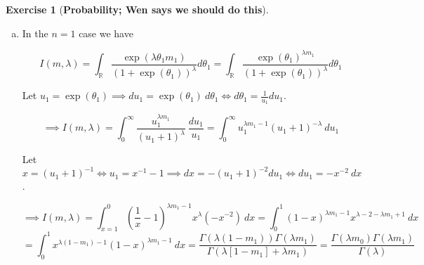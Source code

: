 \documentclass{article}
\theoremstyle{definition}
\newtheorem{exercise}{Exercise}
\theoremstyle{definition}
\theoremstyle{definition}
\theoremstyle{definition}
\begin{document}
\begin{exercise}[\textbf{Probability; Wen says we should do this}]

\begin{enumerate}[(a)]

\item In the \(n=1\) case we have

\[
I(m, \lambda) = \int_{\mathbb{R}} \frac{ \exp(\lambda \theta_1m_1) }{(1 + \exp(\theta_1) ) ^{\lambda}} d \theta_1 = \int_{\mathbb{R}} \frac{ \exp( \theta_1)^{\lambda m_1} }{(1 + \exp(\theta_1) ) ^{\lambda}} d \theta_1
\]

Let \(u_1=  \exp(\theta_1) \implies du_1 =\exp(\theta_1) \ d\theta_1 \iff d\theta_1 = \frac{1}{u_1} du_1\). 

%


\[
\implies I(m, \lambda) =\int_{0}^\infty \frac{ u_1^{\lambda m_1} }{ (u_1 + 1)  ^{\lambda}} \ \frac{ d u_1}{u_1} =\int_{0}^\infty  u_1 ^{\lambda m_1 - 1} (u_1 + 1)  ^{-\lambda} \ d u_1
\]
%
%
%
%

%
%

Let \(x = (u_1 + 1)^{-1} \iff u_1 = x^{-1} - 1 \implies dx = -(u_1 + 1)^{-2} du_1 \iff du_1 = -x^{-2} \ dx  \).

\[
\implies I(m, \lambda)  =\int_{x=1}^0 \left( \frac{1}{x} - 1 \right) ^{\lambda m_1 - 1} x  ^{\lambda}(-x^{-2}) \ d x =\int_{0}^1 ( 1 - x) ^{\lambda m_1 - 1} x  ^{\lambda - 2 - \lambda m_1 + 1} \ d x
\]
\[
= \int_0^1 x^{\lambda(1 - m_1)- 1} (1-x)^{\lambda m_1 - 1} \ dx = \frac{\Gamma(\lambda (1 - m_1)) \Gamma(\lambda m_1)}{\Gamma(\lambda [1 - m_1] + \lambda m_1)}   = \frac{\Gamma(\lambda m_0) \Gamma(\lambda m_1)}{\Gamma(\lambda)}
\]



\end{enumerate}
\end{exercise}
\end{document}
